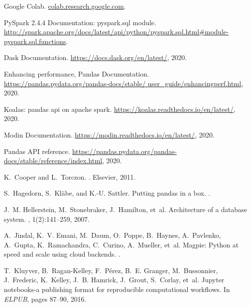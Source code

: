 \documentclass[11pt]{article}
\begin{document}
%
%

\begin{thebibliography}{10}

{Google Colab}.
\newblock \url{colab.research.google.com}.

{PySpark 2.4.4 Documentation: pyspark.sql module}.
\newblock
  \url{http://spark.apache.org/docs/latest/api/python/pyspark.sql.html#module-pyspark.sql.functions}.

{Dask Documentation}.
\newblock \url{https://docs.dask.org/en/latest/}, 2020.

{Enhancing performance, Pandas Documentation}.
\newblock \url{https://pandas.pydata.org/pandas-docs/stable/
  user_guide/enhancingperf.html}, 2020.

{Koalas: pandas api on apache spark}.
\newblock \url{https://koalas.readthedocs.io/en/latest/}, 2020.

{Modin Documentation}.
\newblock \url{https://modin.readthedocs.io/en/latest/}, 2020.

{Pandas API reference}.
\newblock
  \url{https://pandas.pydata.org/pandas-docs/stable/reference/index.html},
  2020.

K.~Cooper and L.~Torczon.
.
\newblock Elsevier, 2011.

S.~Hagedorn, S.~Kl{\"a}be, and K.-U. Sattler.
\newblock Putting pandas in a box.
.

J.~M. Hellerstein, M.~Stonebraker, J.~Hamilton, et~al.
\newblock Architecture of a database system.
,
  1(2):141--259, 2007.

A.~Jindal, K.~V. Emani, M.~Daum, O.~Poppe, B.~Haynes, A.~Pavlenko, A.~Gupta,
  K.~Ramachandra, C.~Curino, A.~Mueller, et~al.
\newblock Magpie: Python at speed and scale using cloud backends.
.

T.~Kluyver, B.~Ragan-Kelley, F.~P{\'e}rez, B.~E. Granger, M.~Bussonnier,
  J.~Frederic, K.~Kelley, J.~B. Hamrick, J.~Grout, S.~Corlay, et~al.
\newblock Jupyter notebooks-a publishing format for reproducible computational
  workflows.
\newblock In {\em ELPUB}, pages 87--90, 2016.


\end{thebibliography}
\end{document}
